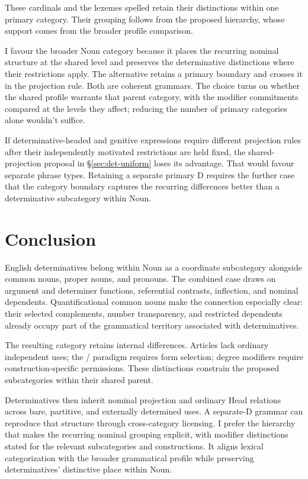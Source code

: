 \documentclass[12pt]{article}
\begin{document}
These cardinals and the lexemes spelled  retain their distinctions within one primary category. Their grouping follows from the proposed hierarchy, whose support comes from the broader profile comparison.

I favour the broader Noun category because it places the recurring nominal structure at the shared level and preserves the determinative distinctions where their restrictions apply. The alternative retains a primary boundary and crosses it in the projection rule. Both are coherent grammars. The choice turns on whether the shared profile warrants that parent category, with the modifier commitments compared at the levels they affect; reducing the number of primary categories alone wouldn't suffice.

If determinative-headed and genitive expressions require different projection rules after their independently motivated restrictions are held fixed, the shared-projection proposal in §\ref{sec:det-uniform} loses its advantage. That would favour separate phrase types. Retaining a separate primary D requires the further case that the category boundary captures the recurring differences better than a determinative subcategory within Noun.

\section{Conclusion}\label{sec:conclusion}

English determinatives belong within Noun as a coordinate subcategory alongside common nouns, proper nouns, and pronouns. The combined case draws on argument and determiner functions, referential contrasts, inflection, and nominal dependents. Quantificational common nouns make the connection especially clear: their selected complements, number transparency, and restricted dependents already occupy part of the grammatical territory associated with determinatives.

The resulting category retains internal differences. Articles lack ordinary independent uses; the /\allowbreak{} paradigm requires form selection; degree modifiers require construction-specific permissions. These distinctions constrain the proposed subcategories within their shared parent.

Determinatives then inherit nominal projection and ordinary Head relations across bare, partitive, and externally determined uses. A separate-D grammar can reproduce that structure through cross-category licensing. I prefer the hierarchy that makes the recurring nominal grouping explicit, with modifier distinctions stated for the relevant subcategories and constructions. It aligns lexical categorization with the broader grammatical profile while preserving determinatives' distinctive place within Noun.
\end{document}
